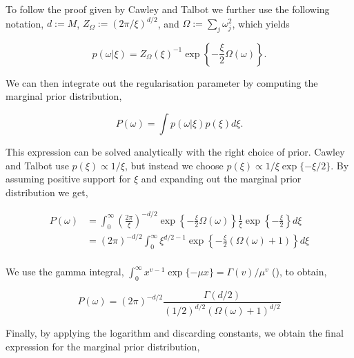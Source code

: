\documentclass[11pt, oneside]{article}
\begin{document}
To follow the proof given by Cawley and Talbot we further use the following notation, $d := M$, $Z_\Omega := \left( 2\pi / \xi \right)^{d/2}$, and $\Omega := \sum_j \omega_j^2$, which yields

\vspace{-0.5cm}
\begin{equation}
    p(\omega | \xi) = {Z_\Omega(\xi)}^{-1}  \exp \left\{ -\frac{\xi}{2} \Omega(\omega)\right\}.
\end{equation}

We can then integrate out the regularisation parameter by computing the marginal prior distribution,

\vspace{-0.5cm}
\begin{equation}
    P(\omega) = \int p(\omega | \xi) p(\xi) d\xi.
\end{equation}

This expression can be solved analytically with the right choice of prior. 
Cawley and Talbot use $p(\xi) \propto 1/\xi$, but instead we choose $p(\xi) \propto 1/\xi \exp\{-\xi/2\}$.
By assuming positive support for $\xi$ and expanding out the marginal prior distribution we get,

\vspace{-0.5cm}
\begin{equation}
\begin{aligned}
    P(\omega) &= \int_0^{\infty} \left( \frac{2\pi}{\xi} \right)^{-d/2}  \exp \left\{ -\frac{\xi}{2} \Omega(\omega)\right\} \frac{1}{\xi} \exp\left\{-\frac{\xi}{2}\right\} d\xi\\
    &= (2\pi)^{-d/2} \int_0^{\infty} \xi^{d/2-1} \exp \left\{ -\frac{\xi}{2} \left(\Omega(\omega) + 1 \right) \right\} d\xi \\
\end{aligned}
\end{equation}

We use the gamma integral, $\int_{0}^{\infty} x^{v-1} \exp\{-\mu x\} = \Gamma(v)/\mu^{v}$ (\cite{Cawley2007}), to obtain,

\vspace{-0.5cm}
\begin{equation}
    P(\omega) = (2\pi)^{-d/2} \frac{\Gamma(d/2)}{(1/2)^{d/2}\left(\Omega(\omega)+1\right)^{d/2}} 
\end{equation}

Finally, by applying the logarithm and discarding constants, we obtain the final expression for the marginal prior distribution,
\end{document}
